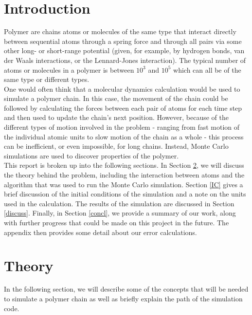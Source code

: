 \documentclass{article}
\begin{document}
\begin{multicols}{2}

\section{Introduction}

Polymer are chains atoms or molecules of the same type that interact directly between sequential atoms through a spring force and through all pairs via some other long- or short-range potential (given, for example, by hydrogen bonds, van der Waals interactions, or the Lennard-Jones interaction).  The typical number of atoms or molecules in a polymer is between $10^3$ and $10^5$ which can all be of the same type or different types.  \\

One would often think that a molecular dynamics calculation would be used to simulate a polymer chain.  In this case, the movement of the chain could be followed by calculating the forces between each pair of atoms for each time step and then used to update the chain's next position.  However, because of the different types of motion involved in the problem - ranging from fast motion of the individual atomic units to slow motion of the chain as a whole - this process can be inefficient, or even impossible, for long chains.  \cite{PhilNotes} Instead, Monte Carlo simulations are used to discover properties of the polymer.  \\

This report is broken up into the following sections.  In Section \ref{theory}, we will discuss the theory behind the problem, including the interaction between atoms and the algorithm that was used to run the Monte Carlo simulation.  Section \ref{IC} gives a brief discussion of the initial conditions of the simulation and a note on the units used in the calculation.  The results of the simulation are discussed in Section \ref{discuss}.  Finally, in Section \ref{concl}, we provide a summary of our work, along with further progress that could be made on this project in the future.  The appendix then provides some detail about our error calculations.  \\

\section{Theory}
\label{theory}

In the following section, we will describe some of the concepts that will be needed to simulate a polymer chain as well as briefly explain the path of the simulation code.


\end{multicols}
\end{document}
